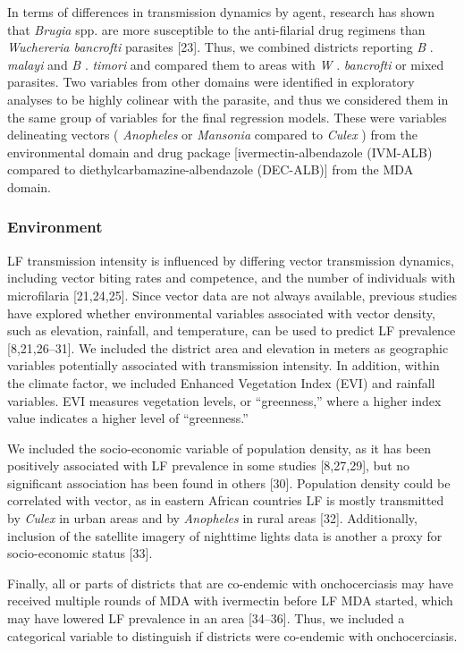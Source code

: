 \documentclass[11pt,a4paper]{article}
\begin{document}
In terms of differences in transmission dynamics by agent, research has shown that \textit{Brugia} spp. are more susceptible to the anti-filarial drug regimens than \textit{Wuchereria bancrofti} parasites [23]. Thus, we combined districts reporting \textit{B} . \textit{malayi} and \textit{B} . \textit{timori} and compared them to areas with \textit{W} . \textit{bancrofti} or mixed parasites. Two variables from other domains were identified in exploratory analyses to be highly colinear with the parasite, and thus we considered them in the same group of variables for the final regression models. These were variables delineating vectors ( \textit{Anopheles} or \textit{Mansonia} compared to \textit{Culex} ) from the environmental domain and drug package [ivermectin-albendazole (IVM-ALB) compared to diethylcarbamazine-albendazole (DEC-ALB)] from the MDA domain.

\subsubsection{Environment}

LF transmission intensity is influenced by differing vector transmission dynamics, including vector biting rates and competence, and the number of individuals with microfilaria [21,24,25]. Since vector data are not always available, previous studies have explored whether environmental variables associated with vector density, such as elevation, rainfall, and temperature, can be used to predict LF prevalence [8,21,26–31]. We included the district area and elevation in meters as geographic variables potentially associated with transmission intensity. In addition, within the climate factor, we included Enhanced Vegetation Index (EVI) and rainfall variables. EVI measures vegetation levels, or “greenness,” where a higher index value indicates a higher level of “greenness.”

We included the socio-economic variable of population density, as it has been positively associated with LF prevalence in some studies [8,27,29], but no significant association has been found in others [30]. Population density could be correlated with vector, as in eastern African countries LF is mostly transmitted by \textit{Culex} in urban areas and by \textit{Anopheles} in rural areas [32]. Additionally, inclusion of the satellite imagery of nighttime lights data is another a proxy for socio-economic status [33].

Finally, all or parts of districts that are co-endemic with onchocerciasis may have received multiple rounds of MDA with ivermectin before LF MDA started, which may have lowered LF prevalence in an area [34–36]. Thus, we included a categorical variable to distinguish if districts were co-endemic with onchocerciasis.
\end{document}
